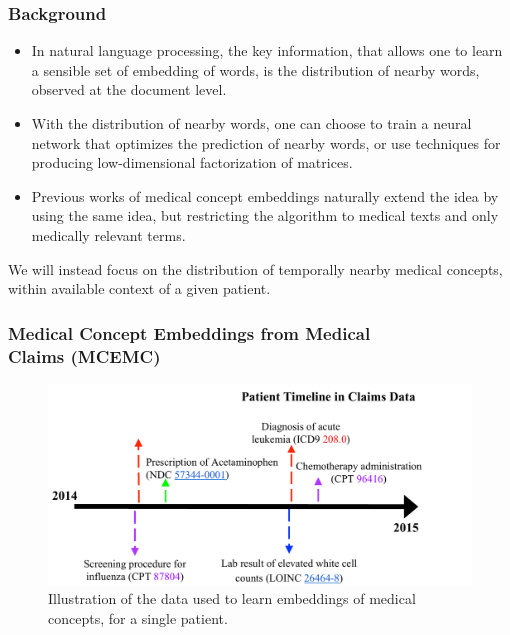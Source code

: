\documentclass{beamer}
\begin{document}
\begin{frame}
\frametitle{Background}
\begin{itemize}
\item In natural language processing, the key
information, that allows one to learn a sensible
set of embedding of words, is 
the distribution of nearby 
words, observed at the document level. 

\bigskip

\item With the distribution of nearby words, 
one can choose to train a neural network
that optimizes the prediction of nearby words,
or use techniques for 
producing low-dimensional factorization of matrices. 


\bigskip

\item Previous works of medical concept embeddings
naturally extend the idea by using the same idea,
but restricting the algorithm to medical texts
and only medically relevant terms. 

\end{itemize}
\end{frame}

\begin{frame}
\centering
We will instead focus on the distribution of 
temporally nearby medical concepts, within
available context of a given patient.

\end{frame}

\begin{frame}
\frametitle{Medical Concept Embeddings from
Medical \\ Claims (MCEMC)}
\begin{figure}[t]
    \centering 
    \includegraphics[width=0.8\linewidth]{figs/Figure1-claims-timeline.pdf}
    \caption{\scriptsize Illustration of the data used to learn
      embeddings of medical concepts, for a single patient.\label{fig:temporal}}
\end{figure}
\end{frame}
\end{document}
